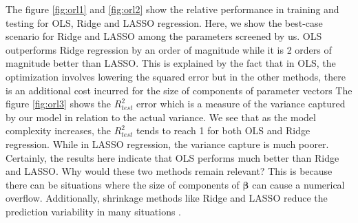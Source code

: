 The figure \ref{fig:orl1} and \ref{fig:orl2} show the relative performance in training and testing for OLS, Ridge and LASSO regression. Here, we show the best-case scenario for Ridge and LASSO among the parameters screened by us. OLS outperforms Ridge regression by an order of magnitude while it is 2 orders of magnitude better than LASSO. This is explained by the fact that in OLS, the optimization involves lowering the squared error but in the other methods, there is an additional cost incurred for the size of components of parameter vectors The figure \ref{fig:orl3} shows the $R^2_{test}$ error which is a measure of the variance captured by our model in relation to the actual variance. We see that as the model complexity increases, the $R^2_{test}$ tends to reach 1 for both OLS and Ridge regression. While in LASSO regression, the variance capture is much poorer. Certainly, the results here indicate that OLS performs much better than Ridge and LASSO. Why would these two methods remain relevant? This is because there can be situations where the size of components of $\boldsymbol \beta$ can cause a numerical overflow. Additionally, shrinkage methods like Ridge and LASSO reduce the prediction variability in many situations \cite{friedman2001elements}.

